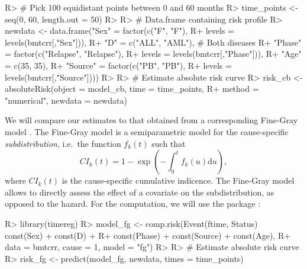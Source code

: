 \documentclass[
]{jss}
\begin{document}
\begin{CodeChunk}

\begin{CodeInput}
R> # Pick 100 equidistant points between 0 and 60 months
R> time_points <- seq(0, 60, length.out = 50)
R> 
R> # Data.frame containing risk profile
R> newdata <- data.frame("Sex" = factor(c("F", "F"), 
R+                                      levels = levels(bmtcrr[,"Sex"])),
R+                       "D" = c("ALL", "AML"), # Both diseases
R+                       "Phase" = factor(c("Relapse", "Relapse"), 
R+                                        levels = levels(bmtcrr[,"Phase"])),
R+                       "Age" = c(35, 35),
R+                       "Source" = factor(c("PB", "PB"), 
R+                                         levels = levels(bmtcrr[,"Source"])))
R> 
R> # Estimate absolute risk curve
R> risk_cb <- absoluteRisk(object = model_cb, time = time_points,
R+                         method = "numerical", newdata = newdata)
\end{CodeInput}
\end{CodeChunk}

We will compare our estimates to that obtained from a corresponding
Fine-Gray model \citeyearpar{fine1999proportional}. The Fine-Gray model
is a semiparametric model for the cause-specific \emph{subdistribution},
i.e.~the function \(f_k(t)\) such that
\[CI_k(t) =1 - \exp\left( - \int_0^t f_k(u) \textrm{d}u \right),\] where
\(CI_k(t)\) is the cause-specific cumulative indicence. The Fine-Gray
model allows to directly assess the effect of a covariate on the
subdistribution, as opposed to the hazard. For the computation, we will
use the  package \citep{timereg}:

\begin{CodeChunk}

\begin{CodeInput}
R> library(timereg)
R> model_fg <- comp.risk(Event(ftime, Status) ~ const(Sex) + const(D) + 
R+                           const(Phase) + const(Source) + const(Age), 
R+                       data = bmtcrr, cause = 1, model = "fg")
R> 
R> # Estimate absolute risk curve
R> risk_fg <- predict(model_fg, newdata, times = time_points)
\end{CodeInput}
\end{CodeChunk}
\end{document}
